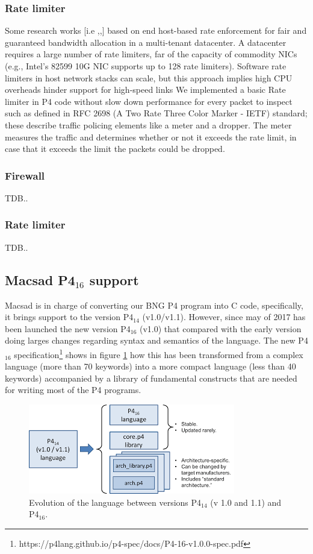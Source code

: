 \subsubsection{Rate limiter}
Some research works [i.e \cite{Rodrigues},\cite{Popa},\cite{Ballani}]  based on end host-based rate enforcement for fair and guaranteed bandwidth allocation  in a  multi-tenant datacenter. 
A datacenter requires a large number of rate limiters, far of the capacity of commodity NICs (e.g., Intel’s 82599 10G NIC supports up to 128 rate limiters). Software rate limiters in host network stacks can scale, but this approach implies high CPU overheads hinder support for high-speed links \cite{Radhakrishnan_2014}
We implemented a basic Rate limiter in P4 code without slow down performance for every packet to inspect such as defined in RFC 2698 (A Two Rate Three Color Marker - IETF) standard; these describe traffic policing elements like a meter and a dropper.  The meter measures the traffic and determines whether or not it exceeds the rate limit, in case that it exceeds the limit the packets could be dropped.

\subsubsection{Firewall}
TDB..

\subsubsection{Rate limiter}
TDB..


\subsection{Macsad P4$_{16}$ support}
Macsad is in charge of converting our BNG P4 program into C code, specifically, it brings support to the version P4$_{14}$ (v1.0/v1.1). However, since may of 2017 has been launched the new version P4$_{16}$ (v1.0) that compared with the early version doing larges changes regarding syntax and semantics of the language.
The new P4$_{16}$ specification\footnote{https://p4lang.github.io/p4-spec/docs/P4-16-v1.0.0-spec.pdf} shows in figure \ref{fig:p4_evol} how this has been transformed from a complex language (more than 70 keywords) into a more compact language (less than 40 keywords) accompanied by a library of fundamental constructs that are needed for writing most of the P4 programs.

\begin{figure}[ht]
	\centering
	\includegraphics[width=0.7\linewidth] {figures/p4_evol.png}
	\caption{Evolution of the language between versions P4$_{14}$ (v 1.0 and 1.1) and P4$_{16}$.  
	}
	\label{fig:p4_evol}
\end{figure}

